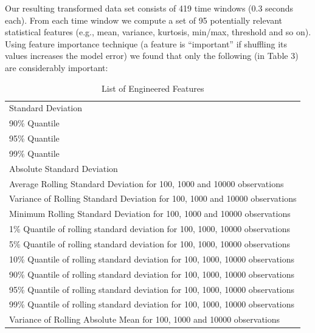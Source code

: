 \documentclass[]{llncs} %
\begin{document}
Our resulting transformed data set consists of 419 time windows (0.3 seconds each).  From each time window we compute a set of 95 potentially relevant statistical features (e.g., mean, variance, kurtosis, min/max, threshold and so on). Using feature importance technique (a feature is “important” if shuffling its values increases the model error) we found that only the following (in Table 3) are considerably important:
\begin{table}[H]
	\begin{center}
		\caption{List of Engineered Features}
		\label{tab:engineeredFeatrures}
		\begin{tabular}{l} 
Standard Deviation \\
90\% Quantile \\
95\% Quantile \\
99\% Quantile \\
Absolute Standard Deviation \\
Average Rolling Standard Deviation for 100, 1000 and 10000 observations \\
Variance of Rolling Standard Deviation for 100, 1000 and 10000 observations \\
Minimum Rolling Standard Deviation for 100, 1000 and 10000 observations \\
1\% Quantile of rolling standard deviation for 100, 1000, 10000 observations \\
5\% Quantile of rolling standard deviation for 100, 1000, 10000 observations \\
10\% Quantile of rolling standard deviation for 100, 1000, 10000 observations \\
90\% Quantile of rolling standard deviation for 100, 1000, 10000 observations \\
95\% Quantile of rolling standard deviation for 100, 1000, 10000 observations \\
99\% Quantile of rolling standard deviation for 100, 1000, 10000 observations \\
Variance of Rolling Absolute Mean for 100, 1000 and 10000 observations \\
		\end{tabular}
	\end{center}
\end{table}
\end{document}
